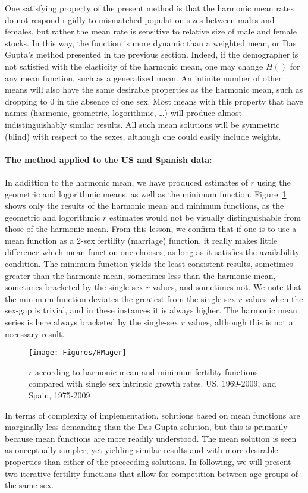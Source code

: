 One satisfying property of the present method is that the harmonic mean
rates do not respond rigidly to mismatched population sizes between males and
females, but rather the mean rate is sensitive to relative size of male and
female stocks. In this way, the function is more dynamic than a weighted mean,
or Das Gupta's method presented in the previous section. Indeed, if the
demographer is not satisfied with the elasticity of the harmonic mean, one may
change $H()$ for any mean function, such as a generalized mean. An infinite number of other means
will also have the same desirable properties as the harmonic mean, such as 
dropping to 0 in the absence of one sex. Most means with this property that have
names (harmonic, geometric, logorithmic, \ldots) will produce almost
indistinguishably similar results. All such mean solutions will be symmetric
(blind) with respect to the sexes, although one could easily include weights.

\paragraph{The method applied to the US and Spanish data: }
In addittion to the harmonic mean, we have produced estimates of $r$ using the
geometric and logorithmic means, as well as the minimum function.
Figure~\ref{fig:schoenr} shows only the results of the harmonic mean and minimum
functions, as the geometric and logorithmic $r$ estimates would not be visually
distinguishable from those of the harmonic mean. From this lesson, we confirm
that if one is to use a mean function as a 2-sex fertility (marriage) function,
it really makes little difference which mean function one chooses, as long as it
satisfies the availability condition. The minimum function yields the least
consistent results, sometimes greater than the harmonic mean, sometimes less
than the harmonic mean, sometimes bracketed by the single-sex $r$ values, and
sometimes not. We note that the minimum function deviates the greatest from the
single-sex $r$ values when the sex-gap is trivial, and in these instances it is
always higher. The harmonic mean series is here always bracketed by the
single-sex $r$ values, although this is not a necessary result.

\begin{figure}[ht!]
        \centering  
          \caption{$r$ according to harmonic mean and minimum fertility
          functions compared with single sex intrinsic growth rates. US,
          1969-2009, and Spain, 1975-2009}
           \texttt{[image: Figures/HMager]}
          \label{fig:schoenr}
\end{figure}

In terms of complexity of implementation, solutions based on mean functions are
marginally less demanding than the Das Gupta solution, but this is primarily
because mean functions are more readily understood. The mean solution is seen as
onceptually simpler, yet yielding similar results and with more desirable
properties than either of the preceeding solutions. In following, we will
present two iterative fertility functions that allow for competition between age-groups of the same sex.

\FloatBarrier
